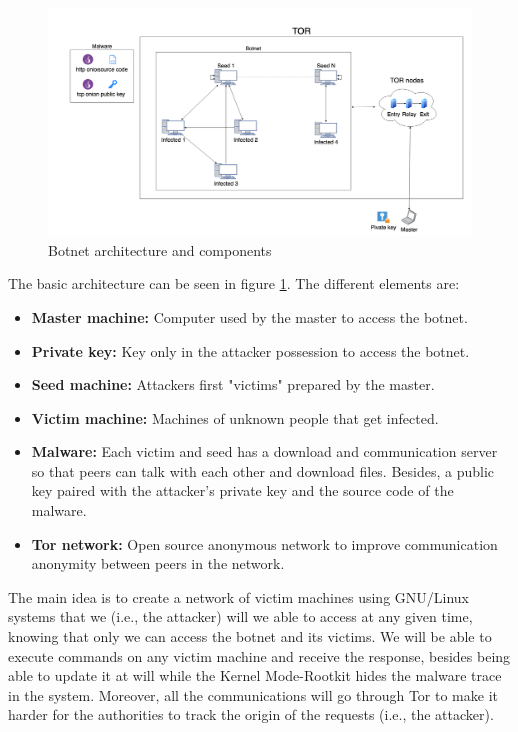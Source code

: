\documentclass[11pt, a4paper,twoside]{tesi_upf}
\begin{document}
\begin{figure}
    \centering
    \includegraphics[width=\linewidth]{images/architecture.png}
    \caption{Botnet architecture and components}
    \label{fig:botnet-architecture}
\end{figure}

The basic architecture can be seen in figure \ref{fig:botnet-architecture}. The different elements are:
\begin{itemize}
    \item \textbf{Master machine:} Computer used by the master to access the botnet.
    \item \textbf{Private key:} Key only in the attacker possession to access the botnet.
    \item \textbf{Seed machine:} Attackers first "victims" prepared by the master.
    \item \textbf{Victim machine:} Machines of unknown people that get infected.
    \item \textbf{Malware:} Each victim and seed has a download and communication server so that peers can talk with each other and download files. Besides, a public key paired with the attacker's private key and the source code of the malware.
    \item \textbf{Tor network:} Open source anonymous network to improve communication anonymity between peers in the network.
\end{itemize}

The main idea is to create a network of victim machines using GNU/Linux systems that we (i.e., the attacker) will we able to access at any given time, knowing that only we can access the botnet and its victims. We will be able to execute commands on any victim machine and receive the response, besides being able to update it at will while the Kernel Mode-Rootkit hides the malware trace in the system. Moreover, all the communications will go through Tor to make it harder for the authorities to track the origin of the requests (i.e., the attacker).
\end{document}
